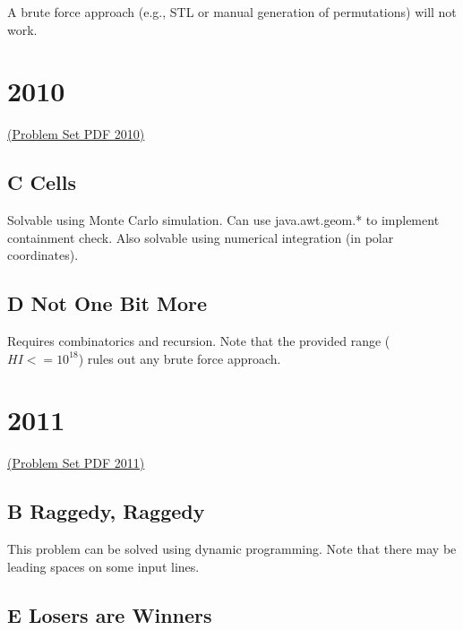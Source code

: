 A brute force approach (e.g., STL  or manual generation of permutations) 
will not work.


\section{2010}
\href{http://midatl.radford.edu/docs/pastProblems/10contest/MidAtlantic2010.pdf}{(Problem Set PDF 2010)}

\subsection{C Cells}
\label{sec:2010-c-cells}

Solvable using Monte Carlo simulation.  Can use java.awt.geom.* to implement containment check.
Also solvable using numerical integration (in polar coordinates).

\subsection{D Not One Bit More}
\label{sec:2010-d-bit}

Requires combinatorics and recursion.
Note that the provided range ($HI <= 10^{18}$) rules out any brute force approach.


\section{2011}

\href{http://midatl.radford.edu/docs/pastProblems/11contest/MidAtlantic2011.pdf}{(Problem Set PDF 2011)}

\subsection{B Raggedy, Raggedy}
\label{sec:2011-b-raggedy}

This problem can be solved using dynamic programming.
Note that there may be leading spaces on some input lines.

\subsection{E Losers are Winners}
\label{sec:2011-e-losers}

